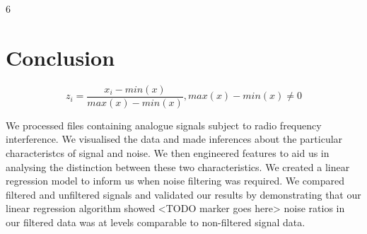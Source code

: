 6\section{Conclusion}

$$ z{_i}=\frac{x{_i}-min(x)}{max(x)-min(x)} ,max(x)-min(x) \neq 0 $$

We processed files containing analogue signals subject to radio frequency interference. We visualised the data and made inferences about the particular characteristcs of signal and noise. We then engineered features to aid us in analysing the distinction between these two characteristics. We created a linear regression model to inform us when noise filtering was required. We compared filtered and unfiltered signals and validated our results by demonstrating that our linear regression algorithm showed <TODO marker goes here> noise ratios in our filtered data was at levels comparable to non-filtered signal data.  